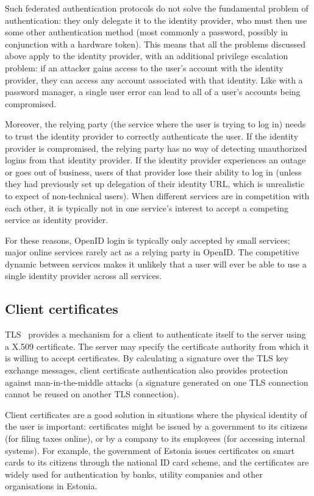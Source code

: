 Such federated authentication protocols do not solve the fundamental problem of authentication: they
only delegate it to the identity provider, who must then use some other authentication method (most
commonly a password, possibly in conjunction with a hardware token). This means that all the
problems discussed above apply to the identity provider, with an additional privilege escalation
problem: if an attacker gains access to the user's account with the identity provider, they can
access any account associated with that identity. Like with a password manager, a single user error
can lead to all of a user's accounts being compromised.

Moreover, the relying party (the service where the user is trying to log in) needs to trust the
identity provider to correctly authenticate the user.  If the identity provider is compromised, the
relying party has no way of detecting unauthorized logins from that identity provider. If the
identity provider experiences an outage or goes out of business, users of that provider lose their
ability to log in (unless they had previously set up delegation of their identity URL, which is
unrealistic to expect of non-technical users). When different services are in competition with each
other, it is typically not in one service's interest to accept a competing service as identity
provider.

For these reasons, OpenID login is typically only accepted by small services; major online services
rarely act as a relying party in OpenID. The competitive dynamic between services makes it unlikely
that a user will ever be able to use a single identity provider across all services.

\subsection{Client certificates}\label{sec:clientcerts}

TLS~\cite{TLS} provides a mechanism for a client to authenticate itself to the server using a X.509
certificate. The server may specify the certificate authority from which it is willing to accept
certificates. By calculating a signature over the TLS key exchange messages, client certificate
authentication also provides protection against man-in-the-middle attacks (a signature generated on
one TLS connection cannot be reused on another TLS connection).

Client certificates are a good solution in situations where the physical identity of the user is
important: certificates might be issued by a government to its citizens (for filing taxes online),
or by a company to its employees (for accessing internal systems). For example, the government of
Estonia issues certificates on smart cards to its citizens through the national ID card scheme, and
the certificates are widely used for authentication by banks, utility companies and other
organisations in Estonia.~\cite{Parsovs14}

